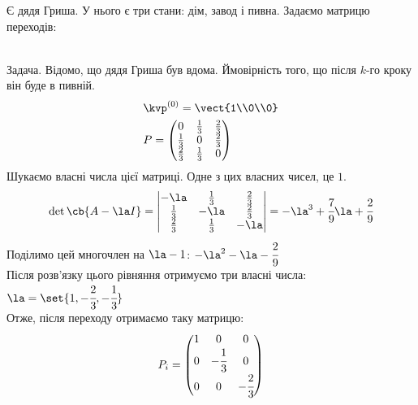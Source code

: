 \begin{exs}
Є дядя Гриша. У нього є три стани: дім, завод і пивна. Задаємо матрицю переходів:
\\
Задача. Відомо, що дядя Гриша був вдома. Ймовірність того, що після $k$-го кроку він буде в пивній.
\begin{eqnarray*}
&\kvp^{(0)} = \vect{1\\0\\0}\\
&P = \begin{pmatrix}
0 & \frac13 & \frac23 \\
\frac13 & 0 & \frac23 \\
\frac23 & \frac13 & 0
\end{pmatrix}
\end{eqnarray*}
Шукаємо власні числа цієї матриці. Одне з цих власних чисел, це $1$.\\
\begin{equation*}
\det \cb{A-\la I} = \begin{vmatrix}
-\la & \frac13 & \frac23 \\
\frac13 & -\la & \frac23 \\
\frac23 & \frac13 & -\la
\end{vmatrix} = -\la^3 +\cfrac79\la + \cfrac29
\end{equation*}
Поділимо цей многочлен на $\la-1$: $-\la^2-\la-\cfrac29$\\
Після розв’язку цього рівняння отримуємо три власні числа: $\la=\set{1,-\cfrac23,-\cfrac13}$\\
Отже, після переходу отримаємо таку матрицю:
\begin{equation*}
P_i = \begin{pmatrix}
1 & 0 & 0\\
0 & -\cfrac13 & 0 \\
0 & 0 & -\cfrac23
\end{pmatrix}
\end{equation*}

\end{exs}
